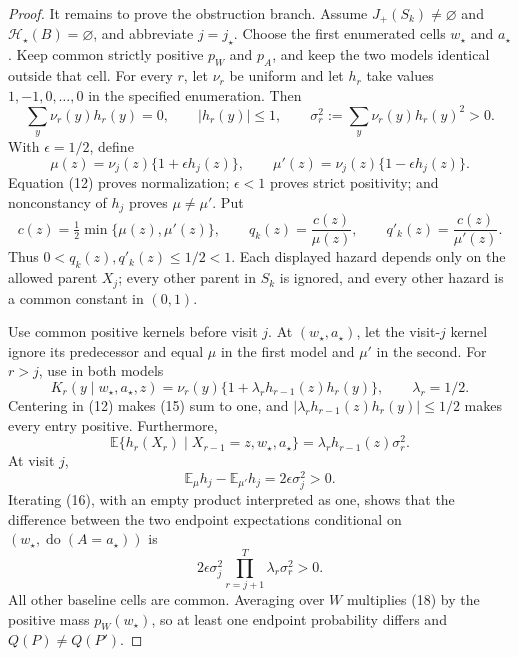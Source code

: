 \documentclass{article}
\begin{document}
\begin{proof}
It remains to prove the obstruction branch.  Assume
\(J_+(S_k)\ne\varnothing\) and \(\mathcal H_\star(B)=\varnothing\), and abbreviate \(j=j_\star\).  Choose the first enumerated cells \(w_\star\) and \(a_\star\).  Keep common strictly positive \(p_W\) and \(p_A\), and keep the two models identical outside that cell.  For every \(r\), let \(\nu_r\) be uniform and let \(h_r\) take values \(1,-1,0,\ldots,0\) in the specified enumeration.  Then
\[
\sum_y\nu_r(y)h_r(y)=0,
\qquad |h_r(y)|\le1,
\qquad \sigma_r^2:=\sum_y\nu_r(y)h_r(y)^2>0.
\tag{12}
\]
With \(\epsilon=1/2\), define
\[
\mu(z)=\nu_j(z)\{1+\epsilon h_j(z)\},
\qquad
\mu'(z)=\nu_j(z)\{1-\epsilon h_j(z)\}.
\tag{13}
\]
Equation (12) proves normalization; \(\epsilon<1\) proves strict positivity; and nonconstancy of \(h_j\) proves \(\mu\ne\mu'\).  Put
\[
c(z)=\tfrac12\min\{\mu(z),\mu'(z)\},
\qquad q_k(z)=\frac{c(z)}{\mu(z)},
\qquad q'_k(z)=\frac{c(z)}{\mu'(z)}.
\tag{14}
\]
Thus \(0<q_k(z),q'_k(z)\le1/2<1\).  Each displayed hazard depends only on the allowed parent \(X_j\); every other parent in \(S_k\) is ignored, and every other hazard is a common constant in \((0,1)\).

Use common positive kernels before visit \(j\).  At \((w_\star,a_\star)\), let the visit-\(j\) kernel ignore its predecessor and equal \(\mu\) in the first model and \(\mu'\) in the second.  For \(r>j\), use in both models
\[
K_r(y\mid w_\star,a_\star,z)
=\nu_r(y)\{1+\lambda_r h_{r-1}(z)h_r(y)\},
\qquad \lambda_r=1/2.
\tag{15}
\]
Centering in (12) makes (15) sum to one, and
\(|\lambda_r h_{r-1}(z)h_r(y)|\le1/2\) makes every entry positive.  Furthermore,
\[
\mathbb E\{h_r(X_r)\mid X_{r-1}=z,w_\star,a_\star\}
=\lambda_r h_{r-1}(z)\sigma_r^2.
\tag{16}
\]
At visit \(j\),
\[
\mathbb E_\mu h_j-\mathbb E_{\mu'}h_j
=2\epsilon\sigma_j^2>0.
\tag{17}
\]
Iterating (16), with an empty product interpreted as one, shows that the difference between the two endpoint expectations conditional on \((w_\star,\operatorname{do}(A=a_\star))\) is
\[
2\epsilon\sigma_j^2
\prod_{r=j+1}^T\lambda_r\sigma_r^2>0.
\tag{18}
\]
All other baseline cells are common.  Averaging over \(W\) multiplies (18) by the positive mass \(p_W(w_\star)\), so at least one endpoint probability differs and \(Q(P)\ne Q(P')\).


\end{proof}
\end{document}
